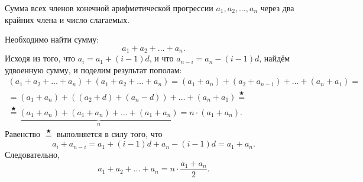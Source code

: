 \documentclass[a4paper, 12pt]{article}
\newcommand{\stareq}{\stackrel{\bigstar}{=}}
\begin{document}
  
\textbf{}
Сумма всех членов конечной арифметической прогрессии 
$a_1, a_2, \ldots, a_n$ через два крайних члена и число слагаемых.
 
\smallskip

\textbf{}
Необходимо найти сумму: 
$$a_1 + a_2 + \ldots + a_n.$$
Исходя из того, что $a_i = a_1 + (i-1) d$, и что $a_{n-i} = a_n - (i-1)d$, найдём удвоенную сумму, и поделим результат пополам:
\begin{multline*}
(a_1 + a_2 + \ldots + a_n) + (a_1 + a_2 + \ldots + a_n)
=
(a_1 + a_n) + (a_2 + a_{n-1}) + \ldots + (a_n + a_1)
= \\ = 
(a_1 + a_n) + ((a_2 + d) + (a_n - d)) + \ldots + (a_n + a_1)
\stareq \\ \stareq 
\underbrace{(a_1 + a_n) + (a_1 + a_n) + \ldots + (a_1 + a_n)}_n
= 
n \cdot (a_1 + a_n).
\end{multline*}
Равенство $\stareq$ выполняется в силу того, что 
$$a_i + a_{n-i} = a_1 + (i-1) d + a_n - (i-1)d = a_1 + a_n.$$
Следовательно, 
$$a_1 + a_2 + \ldots + a_n = n \cdot \dfrac{a_1 + a_n}{2}.$$
\end{document}
